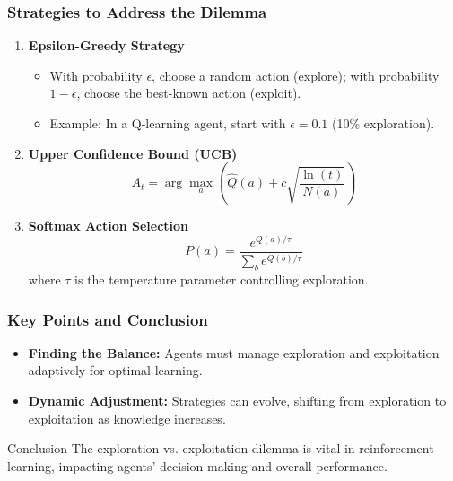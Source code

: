 \documentclass{beamer}
\begin{document}
\begin{frame}[fragile]
    \frametitle{Strategies to Address the Dilemma}
    \begin{enumerate}
        \item \textbf{Epsilon-Greedy Strategy}
        \begin{itemize}
            \item With probability $\epsilon$, choose a random action (explore); with probability $1-\epsilon$, choose the best-known action (exploit).
            \item Example: In a Q-learning agent, start with $\epsilon = 0.1$ (10\% exploration).
        \end{itemize}
        
        \item \textbf{Upper Confidence Bound (UCB)}
        \begin{equation}
            A_t = \arg \max_a \left( \hat{Q}(a) + c \sqrt{\frac{\ln(t)}{N(a)}} \right)
        \end{equation}
        
        \item \textbf{Softmax Action Selection}
        \begin{equation}
            P(a) = \frac{e^{Q(a)/\tau}}{\sum_{b} e^{Q(b)/\tau}}
        \end{equation}
        where $\tau$ is the temperature parameter controlling exploration.
    \end{enumerate}
\end{frame}

\begin{frame}[fragile]
    \frametitle{Key Points and Conclusion}
    \begin{itemize}
        \item \textbf{Finding the Balance:} Agents must manage exploration and exploitation adaptively for optimal learning.
        \item \textbf{Dynamic Adjustment:} Strategies can evolve, shifting from exploration to exploitation as knowledge increases.
    \end{itemize}
    
    \begin{block}{Conclusion}
        The exploration vs. exploitation dilemma is vital in reinforcement learning, impacting agents' decision-making and overall performance.
    \end{block}
\end{frame}
\end{document}
